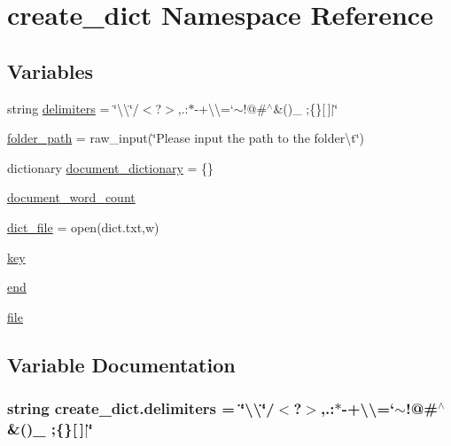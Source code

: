 \hypertarget{namespacecreate__dict}{}\section{create\+\_\+dict Namespace Reference}
\label{namespacecreate__dict}
\subsection*{Variables}
\begin{DoxyCompactItemize}
\item 
string \hyperlink{namespacecreate__dict_ae4975e370ff334361b3a0938678c09f6}{delimiters} = \char`\"{}\textbackslash{}\textquotesingle{}\textbackslash{}\char`\"{}/$<$?$>$,.\+:$\ast$-\/+\textbackslash{}\textbackslash{}=`$\sim$!@\#$^\wedge$\&()\+\_\+ ;\{\}\mbox{[}$\,$\mbox{]}$\vert$\char`\"{}
\item 
\hyperlink{namespacecreate__dict_a94c0ed0928396d28700235a31621124f}{folder\+\_\+path} = raw\+\_\+input(\char`\"{}Please input the path to the folder\textbackslash{}t\char`\"{})
\item 
dictionary \hyperlink{namespacecreate__dict_a523b5abb183f92cbb473ab778d8c7d9f}{document\+\_\+dictionary} = \{\}
\item 
\hyperlink{namespacecreate__dict_afb09c644d11be14d22d9c194ce8904fb}{document\+\_\+word\+\_\+count}
\item 
\hyperlink{namespacecreate__dict_ac24c44c9b8b29bc8a8411916d7a6b349}{dict\+\_\+file} = open(\textquotesingle{}dict.\+txt\textquotesingle{},\textquotesingle{}w\textquotesingle{})
\item 
\hyperlink{namespacecreate__dict_aef9478241bf84f48b590aab0c0bbfc63}{key}
\item 
\hyperlink{namespacecreate__dict_ad4b19f0708a580bdf8ef5f3b5a08d1d2}{end}
\item 
\hyperlink{namespacecreate__dict_a0384d7d11a827e9e7084abff1ac79190}{file}
\end{DoxyCompactItemize}


\subsection{Variable Documentation}
\subsubsection[{\texorpdfstring{delimiters}{delimiters}}]{\setlength{\rightskip}{0pt plus 5cm}string create\+\_\+dict.\+delimiters = \char`\"{}\textbackslash{}\textquotesingle{}\textbackslash{}\char`\"{}/$<$?$>$,.\+:$\ast$-\/+\textbackslash{}\textbackslash{}=`$\sim$!@\#$^\wedge$\&()\+\_\+ ;\{\}\mbox{[}$\,$\mbox{]}$\vert$\char`\"{}}\hypertarget{namespacecreate__dict_ae4975e370ff334361b3a0938678c09f6}{}\label{namespacecreate__dict_ae4975e370ff334361b3a0938678c09f6}


